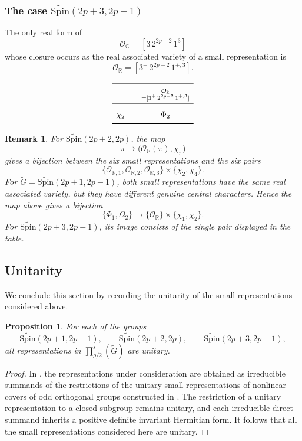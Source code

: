 \documentclass{amsart}
\newcommand{\bbC}{{\mathbb{C}}}
\newcommand{\bbR}{{\mathbb R}}
\newcommand{\Spin}{{\mathrm{Spin}}}
\newtheorem{prop}[thm]{Proposition}
\newtheorem{remark}[thm]{Remark}
\theoremstyle{definition}
\newcommand{\tu}{\widetilde}
\begin{document}
\subsubsection{The case \(\tu{\Spin}(2p+3,2p-1)\)}

The only real form of
\[
\mathcal O_{\bbC}=[3\,2^{2p-2}\,1^3]
\]
whose closure occurs as the real associated variety of a small representation is
\[
\mathcal O_{\bbR}
=
[3^+\,2^{2p-2}\,1^{+,3}].
\]

\[
\renewcommand{\arraystretch}{1.6}
\begin{array}{c@{\qquad}c}
\toprule
&
\substack{
\mathcal O_{\bbR}\\
=[3^+\,2^{2p-2}\,1^{+,3}]
}
\\
\midrule
\chi_2
&
\Phi_2
\\
\bottomrule
\end{array}
\]

\begin{remark}
For \(\tu{\Spin}(2p+2,2p)\), the map
\[
\pi\longmapsto
\bigl(\mathcal O_{\bbR}(\pi),\chi_\pi\bigr)
\]
gives a bijection between the six small representations and the six pairs
\[
\{\mathcal O_{\bbR,1},\mathcal O_{\bbR,2},\mathcal O_{\bbR,3}\}
\times
\{\chi_2,\chi_4\}.
\]
For $\tu G=\tu{\Spin}(2p+1,2p-1)$, both small representations
have the same real associated variety, but they have different genuine
central characters.  Hence the map above gives a bijection
\[
\{\Phi_1,\Omega_2\}
\longrightarrow
\{\mathcal O_{\bbR}\}\times\{\chi_1,\chi_2\}.
\]
 For
\(\tu{\Spin}(2p+3,2p-1)\), its image consists of the single pair displayed
in the table.

\end{remark}
\subsection{Unitarity}

We conclude this section by recording the unitarity of the small
representations considered above.

\begin{prop}\label{p:unitarity-small}
For each of the groups
\[
\tu{\Spin}(2p+1,2p-1),\qquad
\tu{\Spin}(2p+2,2p),\qquad
\tu{\Spin}(2p+3,2p-1),
\]
all representations in \(\prod_{\rho/2}^s(\tu G)\) are unitary.
\end{prop}

\begin{proof}
In \cite[Section~4]{BTs18}, the representations under consideration are
obtained as irreducible summands of the restrictions of the unitary small
representations of nonlinear covers of odd orthogonal groups constructed in
\cite{LS08}. The restriction of a unitary representation to a closed subgroup
remains unitary, and each irreducible direct summand inherits a positive
definite invariant Hermitian form. It follows that all the small
representations considered here are unitary.
\end{proof}
\end{document}
